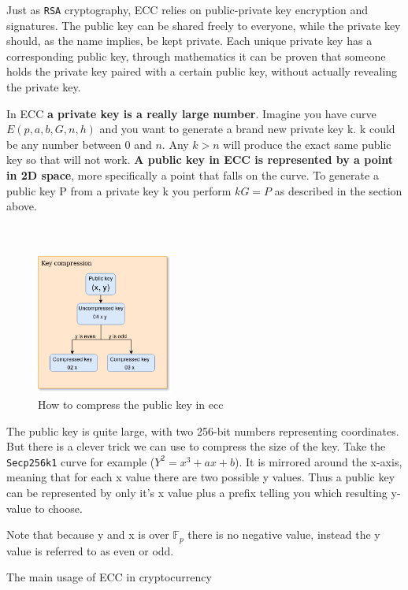 Just as \texttt{RSA} cryptography, ECC relies on public-private key encryption and signatures. The public key can be shared freely to everyone, while the private key should, as the name implies, be kept private. Each unique private key has a corresponding public key, through mathematics it can be proven that someone holds the private key paired with a certain public key, without actually revealing the private key. 

In ECC \textbf{a private key is a really large number}. Imagine you have curve $E(p,a,b,G,n,h)$ and you want to generate a brand new private key k. k could be any number between 0 and $n$. Any $k > n$ will produce the exact same public key so that will not work. \textbf{A public key in ECC is represented by a point in 2D space}, more specifically a point that falls on the curve. To generate a public key P from a private key k you perform $kG = P$ as described in the section above.\\\\\\

\begin{figure}
	\begin{center}
		\includegraphics[width=0.4\textwidth]{background/images/key_compression.png}
	\end{center}
	\caption{How to compress the public key in ecc}
\end{figure}

The public key is quite large, with two 256-bit numbers representing coordinates. But there is a clever trick we can use to compress the size of the key. Take the \texttt{Secp256k1} curve for example ($Y^2=x^3+ax+b$). It is mirrored around the x-axis, meaning that for each x value there are two possible y values. Thus a public key can be represented by only it's x value plus a prefix telling you which resulting y-value to choose. 

Note that because y and x is over $\mathbb{F}_{p}$ there is no negative value, instead the y value is referred to as even or odd. 

The main usage of ECC in cryptocurrency 
